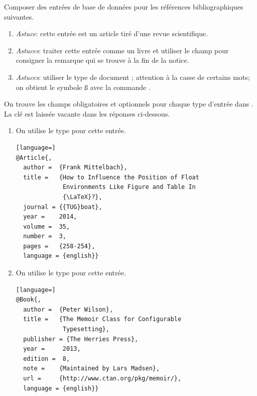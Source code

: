 \begin{exercice}
  Composer des entrées de base de données pour les références
  bibliographiques suivantes.
  \begin{enumerate}
  \item {}

    \emph{Astuce}: cette entrée est un article tiré d'une revue
    scientifique.

  \item {}

    \emph{Astuces}: traiter cette entrée comme un livre et utiliser le
    champ  pour consigner la remarque qui se trouve à la
    fin de la notice.

  \item {}

    \emph{Astuces}: utiliser le type de document ;
    attention à la casse de certains mots; on obtient le symbole {\ss}
    avec la commande \cmdprint{\ss}.
  \end{enumerate}
  \begin{sol}
    On trouve les champs obligatoires et optionnels pour chaque type
    d'entrée dans %
    . %
    La clé est laissée vacante dans les réponses ci-dessous.
    \begin{enumerate}
    \item On utilise le type  pour cette entrée.
\begin{lstlisting}[language=]
@Article{,
  author =  {Frank Mittelbach},
  title =   {How to Influence the Position of Float
             Environments Like Figure and Table In
             {\LaTeX}?},
  journal = {{TUG}boat},
  year =    2014,
  volume =  35,
  number =  3,
  pages =   {258-254},
  language = {english}}
\end{lstlisting}

    \item On utilise le type  pour cette entrée.
\begin{lstlisting}[language=]
@Book{,
  author =  {Peter Wilson},
  title =   {The Memoir Class for Configurable
             Typesetting},
  publisher = {The Herries Press},
  year =     2013,
  edition =  8,
  note =    {Maintained by Lars Madsen},
  url =     {http://www.ctan.org/pkg/memoir/},
  language = {english}}
\end{lstlisting}


\end{enumerate}
\end{sol}
\end{exercice}
